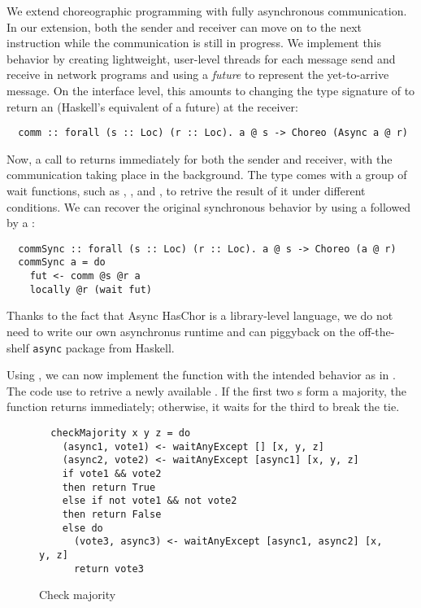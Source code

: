 We extend choreographic programming with fully asynchronous communication.
%
In our extension, both the sender and receiver can move on to the next instruction while the communication is still in progress.
%
We implement this behavior by creating lightweight, user-level threads for each message send and receive in network programs and using a \emph{future} to represent the yet-to-arrive message.
%
On the interface level, this amounts to changing the type signature of  to return an  (Haskell's equivalent of a future) at the receiver:
%
\begin{verbatim}
  comm :: forall (s :: Loc) (r :: Loc). a @ s -> Choreo (Async a @ r)
\end{verbatim}
%
Now, a call to  returns immediately for both the sender and receiver, with the communication taking place in the background.
%
The  type comes with a group of wait functions, such as , , and , to retrive the result of it under different conditions.
%
We can recover the original synchronous behavior by using a  followed by a :
%
\begin{verbatim}
  commSync :: forall (s :: Loc) (r :: Loc). a @ s -> Choreo (a @ r)
  commSync a = do
    fut <- comm @s @r a
    locally @r (wait fut)
\end{verbatim}
%
Thanks to the fact that Async HasChor is a library-level language, we do not need to write our own asynchronus runtime and can piggyback on the off-the-shelf \texttt{async} package from Haskell.

Using , we can now implement the  function with the intended behavior as in .
%
The code use  to retrive a newly available .
%
If the first two s form a majority, the function returns immediately; otherwise, it waits for the third  to break the tie.

\begin{figure}[th]
\begin{verbatim}
  checkMajority x y z = do
    (async1, vote1) <- waitAnyExcept [] [x, y, z]  
    (async2, vote2) <- waitAnyExcept [async1] [x, y, z]
    if vote1 && vote2              
    then return True
    else if not vote1 && not vote2
    then return False
    else do                                  
      (vote3, async3) <- waitAnyExcept [async1, async2] [x, y, z]
      return vote3
\end{verbatim}
\caption{Check majority}
\label{fig:check-majority}
\end{figure}

